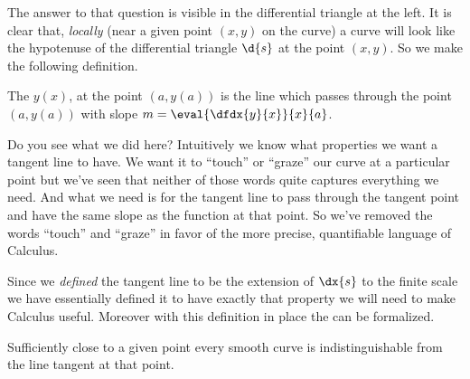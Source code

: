 The answer to that question is visible in the differential triangle at
the left. It is clear that, \emph{locally} (near a given point $(x,y)$
on the curve) a curve will look like the hypotenuse of the
differential triangle $\d{s}$ at the point $(x,y)$.  So we make the
following definition.

\begin{mydefinition}
  \label{def:TangentLine}
  The  $y(x)$, at the point
  $(a,y(a))$ is the line which passes through the point $(a,y(a))$
  with slope $m=\eval{\dfdx{y}{x}}{x}{a}$.
\end{mydefinition}

Do you  see what we did here? Intuitively we know what properties we want a
tangent line to have. We want it to ``touch'' or ``graze'' our
curve at a particular point but we've seen that neither of those words
quite captures everything we need. And what we need is for the tangent
line to pass through the tangent point and have the same slope as the
function at that point. So we've removed the words ``touch'' and
``graze'' in favor of the more precise, quantifiable language of Calculus. 


Since we \emph{defined} the tangent line to be the extension of
$\dx{s}$ to the finite scale we have essentially defined it to have
exactly that property we will need to make Calculus useful.  Moreover
with this definition in place the 
can be formalized.

\begin{mydefinition}
  \label{def:LocalLinearity}
  Sufficiently close to a given point every smooth curve is
  indistinguishable from the line tangent at that point.
\end{mydefinition}

